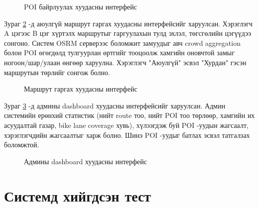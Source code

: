 \begin{figure}[H]
    \centering
    \caption{POI байрлуулах хуудасны интерфейс}
    \label{fig:poi}
\end{figure}
\par \noindent Зураг \ref{fig:route} -д аюулгүй маршрут гаргах хуудасны интерфейсийг харуулсан. Хэрэглэгч A цэгээс B цэг хүртэлх маршрутыг гаргуулахын тулд эхлэл, төгсгөлийн цэгүүдээ сонгоно. Систем OSRM серверээс боломжит замуудыг авч crowd aggregation болон POI өгөгдөлд тулгуурлан өртгийг тооцоолж хамгийн оновчтой замыг ногоон/шар/улаан өнгөөр харуулна. Хэрэглэгч "Аюулгүй" эсвэл "Хурдан" гэсэн маршрутын төрлийг сонгож болно.
\begin{figure}[H]
    \centering
    \caption{Маршрут гаргах хуудасны интерфейс}
    \label{fig:route}
\end{figure}
\par \noindent Зураг \ref{fig:admin} -д админы dashboard хуудасны интерфейсийг харуулсан. Админ системийн ерөнхий статистик (нийт route тоо, нийт POI тоо төрлөөр, хамгийн их асуудалтай газар, bike lane coverage хувь), хүлээгдэж буй POI -уудын жагсаалт, хэрэглэгчдийн жагсаалтыг харж болно. Шинэ POI -уудыг батлах эсвэл татгалзах боломжтой.
\begin{figure}[H]
    \centering
    \caption{Админы dashboard хуудасны интерфейс}
    \label{fig:admin}
\end{figure}

\section{Системд хийгдсэн тест}
